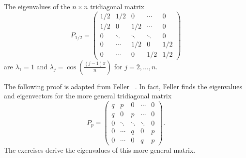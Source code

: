 \documentclass[12pt]{article}
\begin{document}
\begin{lemma}
    \label{fastestmixing:lemma:three} The eigenvalues of the \( n \times
    n \) tridiagonal matrix
    \[
        P_{1/2} =
        \begin{pmatrix}
            1/2 & 1/2 & 0 & \cdots & 0 \\
            1/2 & 0 & 1/2 & \cdots & 0 \\
            0 & \ddots & \ddots & \ddots& 0 \\
            0 & \cdots & 1/2 & 0 & 1/2 \\
            0 & \cdots & 0 & 1/2 & 1/2
        \end{pmatrix}
    \] are \( \lambda_1 = 1 \) and \( \lambda_j = \cos\left( \frac{(j-1)
    \pi}{n} \right) \) for \( j=2, \dots, n \).
\end{lemma}

\begin{remark}
    The following proof is adapted from Feller~%
    \cite[Section XVI.4]{feller73}.  In fact, Feller finds the
    eigenvalues and eigenvectors for the more general tridiagonal matrix
    \[
        P_{p} =
        \begin{pmatrix}
            q & p & 0 & \cdots & 0 \\
            q & 0 & p & \cdots & 0 \\
            0 & \ddots & \ddots & \ddots& 0 \\
            0 & \cdots & q & 0 & p \\
            0 & \cdots & 0 & q & p
        \end{pmatrix}
        .
    \] The exercises derive the eigenvalues of this more general matrix.
\end{remark}
\end{document}
